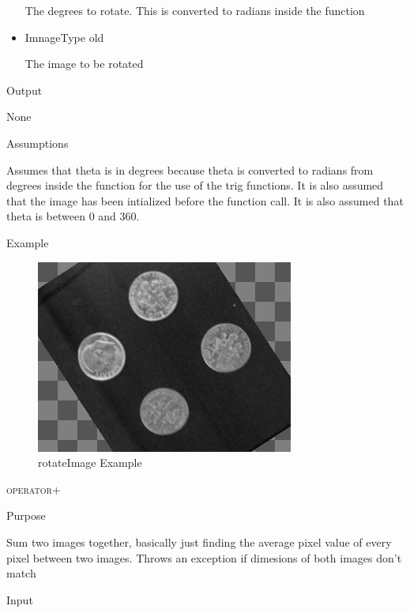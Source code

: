 \documentclass[pdftex, 11pt]{article}
\begin{document}
\begin{description}
\begin{description}
\begin{itemize}
						The degrees to rotate. This is converted
						to radians inside the function

					\item{ImnageType old}

						The image to be rotated

				\end{itemize}

			\item{Output}

				None

			\item{Assumptions}

				Assumes that theta is in degrees because theta is
				converted to radians from degrees inside the function
				for the use of the trig functions.
				It is also assumed that the image has been intialized
				before the function call. It is also assumed that theta
				is between 0 and 360.

			\item{Example}

				\begin{figure}[h]
					\centering
					\caption{rotateImage Example}
				\includegraphics{images/outrotate.png}
			\end{figure}

		\end{description}


	\item{\textsc{operator+}}
		\begin{description}
			\item{Purpose}

				
				Sum two images together, basically just finding
				the average pixel value of
				every pixel between two images.  Throws an
				exception if dimesions of both
				images don't match

			\item{Input}


\end{description}
\end{description}
\end{document}
